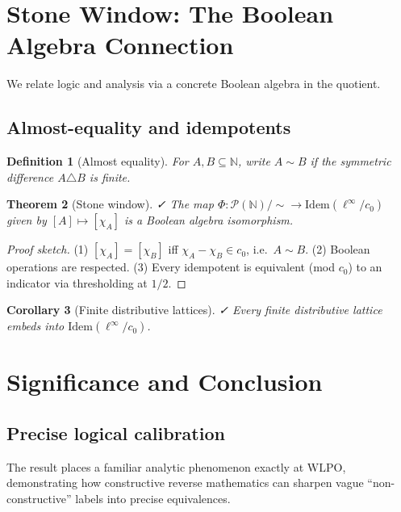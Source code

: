 \documentclass[11pt]{article}  %
\newtheorem{theorem}{Theorem}[section]
\newtheorem{corollary}[theorem]{Corollary}
\newtheorem{definition}[theorem]{Definition}
\newenvironment{thm}{\begin{theorem}}{\end{theorem}}
\newenvironment{cor}{\begin{corollary}}{\end{corollary}}
\newenvironment{defi}{\begin{definition}}{\end{definition}}
\newtheorem{theorem}{Theorem}[section]
\newtheorem{corollary}[theorem]{Corollary}
\newtheorem{definition}[theorem]{Definition}
\newenvironment{thm}{\begin{theorem}}{\end{theorem}}
\newenvironment{cor}{\begin{corollary}}{\end{corollary}}
\newenvironment{defi}{\begin{definition}}{\end{definition}}
\newcommand{\leanok}{\textsf{\small \textcolor{green!70!black}{✓}}}
\newcommand{\N}{\mathbb{N}}
\newcommand{\linf}{\ell^\infty}
\newcommand{\cnull}{c_0}
\newcommand{\WLPO}{\mathrm{WLPO}}
\begin{document}
\section{Stone Window: The Boolean Algebra Connection}\label{sec:stone}

We relate logic and analysis via a concrete Boolean algebra in the quotient.

\subsection{Almost-equality and idempotents}

\begin{defi}[Almost equality]
For $A,B\subseteq\N$, write $A\sim B$ if the symmetric difference $A\triangle B$ is finite.
\end{defi}

\begin{thm}[Stone window]\label{thm:stone}\leanok
The map $\Phi:\mathcal{P}(\N)/{\sim}\to \mathrm{Idem}(\linf/\cnull)$ given by $[A]\mapsto [\chi_A]$ is a Boolean algebra isomorphism.
\end{thm}

\begin{proof}[Proof sketch]
(1) $[\chi_A]=[\chi_B]$ iff $\chi_A-\chi_B\in \cnull$, i.e.\ $A\sim B$.  
(2) Boolean operations are respected.  
(3) Every idempotent is equivalent (mod $\cnull$) to an indicator via thresholding at $1/2$.
\end{proof}

\begin{cor}[Finite distributive lattices]\leanok
Every finite distributive lattice embeds into $\mathrm{Idem}(\linf/\cnull)$.
\end{cor}

\section{Significance and Conclusion}

\subsection{Precise logical calibration}

The result places a familiar analytic phenomenon exactly at $\WLPO$, demonstrating how constructive reverse mathematics can sharpen vague ``non-constructive'' labels into precise equivalences.
\end{document}
